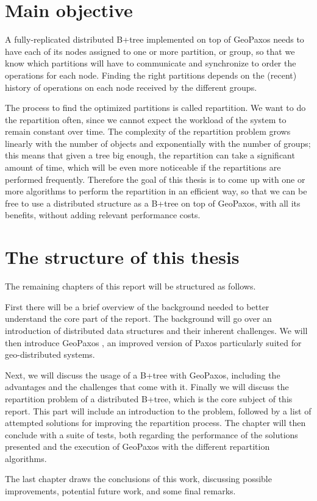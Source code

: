 \section{Main objective}\label{sec:main-objective}
A fully-replicated distributed B+tree implemented on top of GeoPaxos needs to have each of its nodes assigned to one or more partition, or group, so that we know which partitions will have to communicate and synchronize to order the operations for each node. Finding the right partitions depends on the (recent) history of operations on each node received by the different groups.

The process to find the optimized partitions is called repartition. We want to do the repartition often, since we cannot expect the workload of the system to remain constant over time. The complexity of the repartition problem grows linearly with the number of objects and exponentially with the number of groups; this means that given a tree big enough, the repartition can take a significant amount of time, which will be even more noticeable if the repartitions are performed frequently. Therefore the goal of this thesis is to come up with one or more algorithms to perform the repartition in an efficient way, so that we can be free to use a distributed structure as a B+tree on top of GeoPaxos, with all its benefits, without adding relevant performance costs.

\section{The structure of this thesis}\label{the-structure-of-this-thesis}
The remaining chapters of this report will be structured as follows.

First there will be a brief overview of the background needed to better understand the core part of the report. The background will go over an introduction of distributed data structures and their inherent challenges. We will then introduce GeoPaxos \citep{geopaxos}, an improved version of Paxos particularly suited for geo-distributed systems. 

Next, we will discuss the usage of a B+tree with GeoPaxos, including the advantages and the challenges that come with it. Finally we will discuss the repartition problem of a distributed B+tree, which is the core subject of this report. This part will include an introduction to the problem, followed by a list of attempted solutions for improving the repartition process. The chapter will then conclude with a suite of tests, both regarding the performance of the solutions presented and the execution of GeoPaxos with the different repartition algorithms.

The last chapter draws the conclusions of this work, discussing possible improvements, potential future work, and some final remarks.
